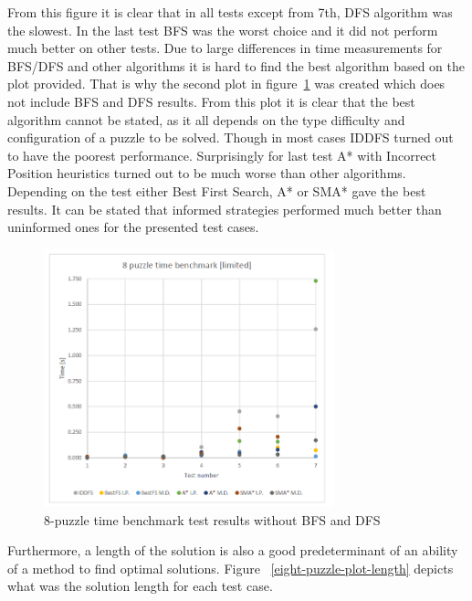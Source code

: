 \documentclass[12pt]{article}
\begin{document}
From this figure it is clear that in all tests except from 7th,  DFS algorithm was the slowest. In the last test BFS was the worst choice and it did not perform much better on other tests. Due to large differences in time measurements for BFS/DFS and other algorithms it is hard to find the best algorithm based on the plot provided. That is why the second plot in figure~\ref{eight-puzzle-plot-limited} was created which does not include BFS and DFS results. From this plot it is clear that the best algorithm cannot be stated, as it all depends on the type difficulty and configuration of a puzzle to be solved. Though in most cases IDDFS turned out to have the poorest performance. Surprisingly for last test A* with Incorrect Position heuristics turned out to be much worse than other algorithms. Depending on the test either Best First Search, A* or SMA* gave the best results. It can be stated that informed strategies performed much better than uninformed ones for the presented test cases.

 \begin{figure}[h]
    \includegraphics[width=0.75\textwidth]{8_puzzle_plot_limited}
    \centering
    \caption{8-puzzle time benchmark test results without BFS and DFS}
\label {eight-puzzle-plot-limited}
\end{figure}

Furthermore, a length of the solution is also a good predeterminant of an ability of a method to find optimal solutions. Figure ~\ref{eight-puzzle-plot-length} depicts what was the solution length for each test case.
\end{document}
